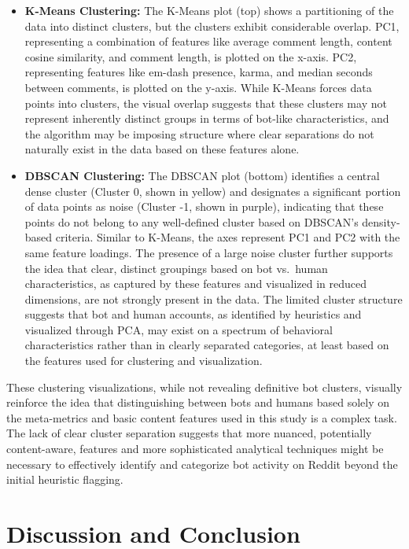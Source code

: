\documentclass[
  12pt,
  letterpaper,
  DIV=11,
  numbers=noendperiod]{scrartcl}
\begin{document}
\begin{itemize}
\item
  \textbf{K-Means Clustering:} The K-Means plot (top) shows a
  partitioning of the data into distinct clusters, but the clusters
  exhibit considerable overlap. PC1, representing a combination of
  features like average comment length, content cosine similarity, and
  comment length, is plotted on the x-axis. PC2, representing features
  like em-dash presence, karma, and median seconds between comments, is
  plotted on the y-axis. While K-Means forces data points into clusters,
  the visual overlap suggests that these clusters may not represent
  inherently distinct groups in terms of bot-like characteristics, and
  the algorithm may be imposing structure where clear separations do not
  naturally exist in the data based on these features alone.
\item
  \textbf{DBSCAN Clustering:} The DBSCAN plot (bottom) identifies a
  central dense cluster (Cluster 0, shown in yellow) and designates a
  significant portion of data points as noise (Cluster -1, shown in
  purple), indicating that these points do not belong to any
  well-defined cluster based on DBSCAN's density-based criteria. Similar
  to K-Means, the axes represent PC1 and PC2 with the same feature
  loadings. The presence of a large noise cluster further supports the
  idea that clear, distinct groupings based on bot vs.~human
  characteristics, as captured by these features and visualized in
  reduced dimensions, are not strongly present in the data. The limited
  cluster structure suggests that bot and human accounts, as identified
  by heuristics and visualized through PCA, may exist on a spectrum of
  behavioral characteristics rather than in clearly separated
  categories, at least based on the features used for clustering and
  visualization.
\end{itemize}

These clustering visualizations, while not revealing definitive bot
clusters, visually reinforce the idea that distinguishing between bots
and humans based solely on the meta-metrics and basic content features
used in this study is a complex task. The lack of clear cluster
separation suggests that more nuanced, potentially content-aware,
features and more sophisticated analytical techniques might be necessary
to effectively identify and categorize bot activity on Reddit beyond the
initial heuristic flagging.

\section{Discussion and Conclusion}\label{discussion-and-conclusion}
\end{document}
